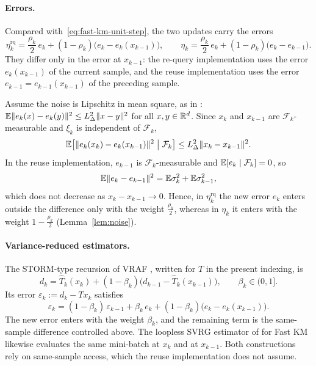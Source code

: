 \documentclass[10pt,draft]{article}
\numberwithin{equation}{section}
\theoremstyle{definition}
\theoremstyle{remark}
\newcommand{\HH}{\RR^d}
\newcommand{\FF}{\mathcal F}
\newcommand{\norm}[1]{\lVert #1\rVert}
\begin{document}
\paragraph{Errors.} Compared with~\eqref{eq:fast-km-unit-step}, the two
updates carry the errors
\begin{equation}\label{eq:requery-error}
 \eta_k^{\mathrm{rq}}=\frac{\rho_k}{2}\,e_k
 +(1-\rho_k)\bigl(e_k-e_k(x_{k-1})\bigr),
 \qquad
 \eta_k=\frac{\rho_k}{2}\,e_k+(1-\rho_k)\bigl(e_k-e_{k-1}\bigr).
\end{equation}
They differ only in the error at $x_{k-1}$: the re-query implementation
uses the error $e_k(x_{k-1})$ of the current sample, and the reuse
implementation uses the error $e_{k-1}=e_{k-1}(x_{k-1})$ of the preceding
sample.

Assume the noise is Lipschitz in mean square, as in
\cite[Assumption~2.4]{lee2026fixed}:
$\EE\norm{e_k(x)-e_k(y)}^2\leq L_\Delta^2\norm{x-y}^2$ for all
$x,y\in\HH$. Since $x_k$ and $x_{k-1}$ are $\FF_k$-measurable and $\xi_k$ is
independent of $\FF_k$,
\[
 \EE\bigl[\norm{e_k(x_k)-e_k(x_{k-1})}^2\bigm|\FF_k\bigr]
 \leq L_\Delta^2\norm{x_k-x_{k-1}}^2.
\]
In the reuse implementation, $e_{k-1}$ is $\FF_k$-measurable and
$\EE[e_k\mid\FF_k]=0$, so
\[
 \EE\norm{e_k-e_{k-1}}^2=\EE\sigma_k^2+\EE\sigma_{k-1}^2,
\]
which does not decrease as $x_k-x_{k-1}\to0$. Hence, in
$\eta_k^{\mathrm{rq}}$ the new error $e_k$ enters outside the difference
only with the weight $\frac{\rho_k}{2}$, whereas in $\eta_k$ it enters with
the weight $1-\frac{\rho_k}{2}$ (Lemma~\ref{lem:noise}).

\paragraph{Variance-reduced estimators.} The STORM-type recursion of VRAF
\cite[(VRAF)]{lee2026fixed}, written for $T$ in the present indexing, is
\[
 d_k=\widehat T_k(x_k)+(1-\beta_k)\bigl(d_{k-1}-\widehat T_k(x_{k-1})\bigr),
 \qquad\beta_k\in(0,1].
\]
Its error $\varepsilon_k:=d_k-Tx_k$ satisfies
\[
 \varepsilon_k=(1-\beta_k)\,\varepsilon_{k-1}+\beta_k\,e_k
 +(1-\beta_k)\bigl(e_k-e_k(x_{k-1})\bigr).
\]
The new error enters with the weight $\beta_k$, and the remaining term is
the same-sample difference controlled above. The loopless SVRG estimator of
\cite[(7)]{trandinh2024vrfkm} for Fast KM likewise evaluates the same
mini-batch at $x_k$ and at $x_{k-1}$. Both constructions rely on
same-sample access, which the reuse implementation does not assume.



\end{document}
